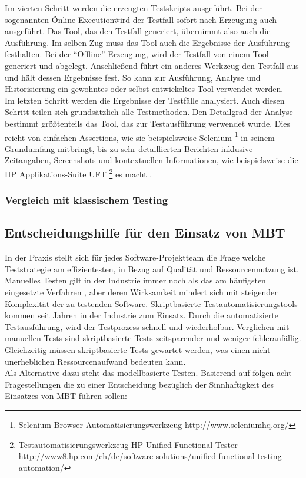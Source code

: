 Im vierten Schritt werden die erzeugten Testskripts ausgeführt. Bei der sogenannten \"Online-Execution\" wird der Testfall sofort nach Erzeugung auch ausgeführt. Das Tool, das den Testfall generiert, übernimmt also auch die Ausführung. Im selben Zug muss das Tool auch die Ergebnisse der Ausführung festhalten. Bei der ``Offline'' Erzeugung, wird der Testfall von einem Tool generiert und abgelegt. Anschließend führt ein anderes Werkzeug den Testfall aus und hält dessen Ergebnisse fest. So kann zur Ausführung, Analyse und Historisierung ein gewohntes oder selbst entwickeltes Tool verwendet werden.\\
Im letzten Schritt werden die Ergebnisse der Testfälle analysiert. Auch diesen Schritt teilen sich grundsätzlich alle Testmethoden. Den Detailgrad der Analyse bestimmt größtenteils das Tool, das zur Testausführung verwendet wurde. Dies reicht von einfachen Assertions, wie sie beispielsweise Selenium \footnote{Selenium Browser Automatisierungswerkzeug http://www.seleniumhq.org/} in seinem Grundumfang mitbringt, bis zu sehr detaillierten Berichten inklusive Zeitangaben, Screenshots und kontextuellen Informationen, wie beispielsweise die HP Applikations-Suite UFT \footnote{Testautomatisierungswerkzeug HP Unified Functional Tester http://www8.hp.com/ch/de/software-solutions/unified-functional-testing-automation/} es macht .


\subsubsection{Vergleich mit klassischem Testing}

\subsection{Entscheidungshilfe für den Einsatz von MBT}
In der Praxis stellt sich für jedes Software-Projektteam die Frage welche Teststrategie am effizientesten, in Bezug auf Qualität und Ressourcennutzung ist. Manuelles Testen gilt in der Industrie immer noch als das am häufigsten eingesetzte Verfahren \cite{guldali_starthilfe_2010}, aber deren Wirksamkeit mindert sich mit steigender Komplexität der zu testenden Software. Skriptbasierte Testautomatisierungstools kommen seit Jahren in der Industrie zum Einsatz. Durch die automatisierte Testausführung, wird der Testprozess schnell und wiederholbar. Verglichen mit manuellen Tests sind skriptbasierte Tests zeitsparender und weniger fehleranfällig. Gleichzeitig müssen skriptbasierte Tests gewartet werden, was einen nicht unerheblichen Ressourcenaufwand bedeuten kann.\\
Als Alternative dazu steht das modellbasierte Testen. Basierend auf \cite{guldali_starthilfe_2010} folgen acht Fragestellungen die zu einer Entscheidung bezüglich der Sinnhaftigkeit des Einsatzes von MBT führen sollen:

